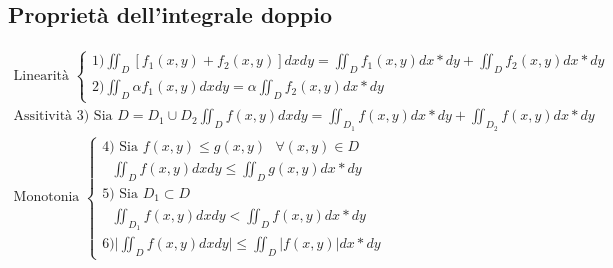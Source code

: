 \documentclass{book}
\newcommand{\abs}[1]{\lvert#1\rvert}
\begin{document}
\subsection{Proprietà dell'integrale doppio}
\begin{equation*}
  \begin{matrix}
  \text{Linearità } \begin{cases}
                      1) \iint_D [f_1(x,y)+f_2(x,y)]dxdy=\iint_Df_1(x,y)dx*dy+\iint_Df_2(x,y)dx*dy\\
                      2) \iint_D \alpha f_1(x,y)dxdy=\alpha\iint_Df_2(x,y)dx*dy
                    \end{cases}\\
    \text{Assitività } 3)\text{ Sia } D=D_1\cup D_2 \iint_Df(x,y)dxdy=\iint_{D_1}f(x,y)dx*dy +\iint_{D_2}f(x,y)dx*dy\\
    \text{Monotonia } \begin{cases}
                        4) \text{ Sia } f(x,y)\leq g(x,y)\text{ } \forall (x,y) \in D\\
                        \text{ }\iint_Df(x,y)dxdy \leq \iint_Dg(x,y)dx*dy\\
                        5) \text{ Sia } D_1 \subset D\\
                        \text{ } \iint_{D_1}f(x,y)dxdy < \iint_Df(x,y)dx*dy \\
                        6) \abs{\iint_Df(x,y)dxdy} \leq \iint_D\abs{f(x,y)}dx*dy
                      \end{cases}
  \end{matrix}
\end{equation*} 
\end{document}
